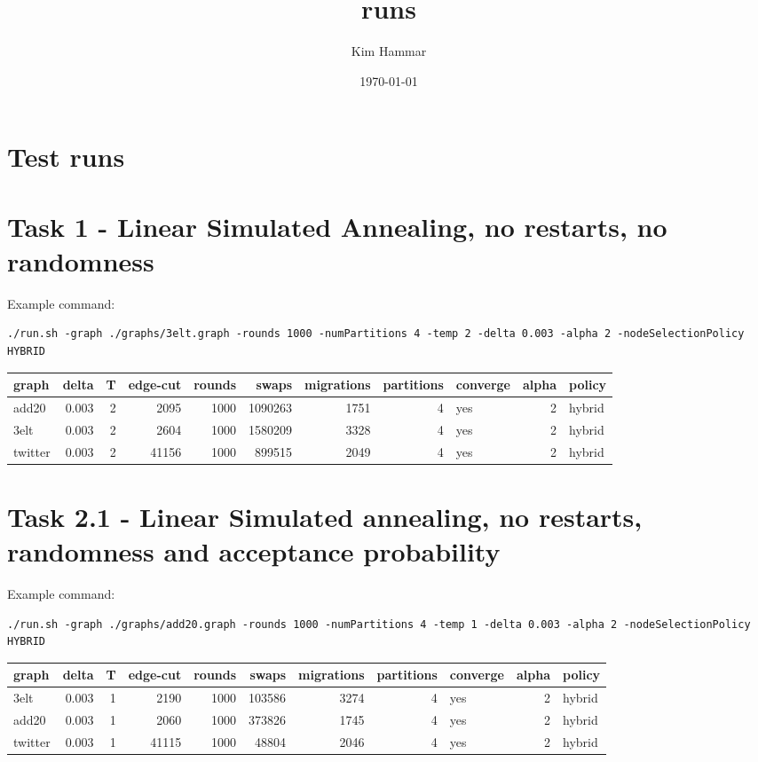 \documentclass[11pt]{article}
\author{Kim Hammar}
\date{\today}
\title{runs}
\begin{document}
\maketitle
\tableofcontents

\section{Test runs}
\label{sec-1}


\section{Task 1 - Linear Simulated Annealing, no restarts, no randomness}
\label{sec-2}

Example command:
\begin{verbatim}
./run.sh -graph ./graphs/3elt.graph -rounds 1000 -numPartitions 4 -temp 2 -delta 0.003 -alpha 2 -nodeSelectionPolicy HYBRID
\end{verbatim}

\begin{center}
\begin{tabular}{lrrrrrrrlrl}
graph & delta & T & edge-cut & rounds & swaps & migrations & partitions & converge & alpha & policy\\
\hline
add20 & 0.003 & 2 & 2095 & 1000 & 1090263 & 1751 & 4 & yes & 2 & hybrid\\
3elt & 0.003 & 2 & 2604 & 1000 & 1580209 & 3328 & 4 & yes & 2 & hybrid\\
twitter & 0.003 & 2 & 41156 & 1000 & 899515 & 2049 & 4 & yes & 2 & hybrid\\
\end{tabular}
\end{center}

\section{Task 2.1 - Linear Simulated annealing, no restarts, randomness and acceptance probability}
\label{sec-3}

Example command:

\begin{verbatim}
./run.sh -graph ./graphs/add20.graph -rounds 1000 -numPartitions 4 -temp 1 -delta 0.003 -alpha 2 -nodeSelectionPolicy HYBRID
\end{verbatim}
\begin{center}
\begin{tabular}{lrrrrrrrlrl}
graph & delta & T & edge-cut & rounds & swaps & migrations & partitions & converge & alpha & policy\\
\hline
3elt & 0.003 & 1 & 2190 & 1000 & 103586 & 3274 & 4 & yes & 2 & hybrid\\
add20 & 0.003 & 1 & 2060 & 1000 & 373826 & 1745 & 4 & yes & 2 & hybrid\\
twitter & 0.003 & 1 & 41115 & 1000 & 48804 & 2046 & 4 & yes & 2 & hybrid\\
\end{tabular}
\end{center}
\end{document}
